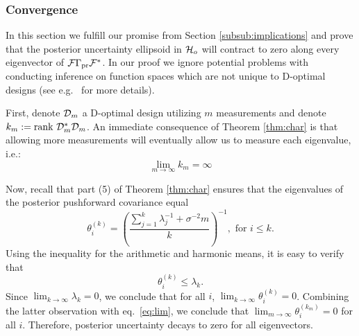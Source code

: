\subsubsection{Convergence}\label{subsub:convergence}
In this section we fulfill our promise from Section
\ref{subsub:implications} and prove that the posterior uncertainty
ellipsoid in $\mathcal{H}_o$ will contract to zero along every eigenvector of
$\mathcal{F} \Gamma_{\textup{pr}} \mathcal{F}^*$. In our proof we ignore potential problems with
conducting inference on function spaces which are not unique to
D-optimal designs (see e.g.~\cite{owhadi2015} for more details).


First, denote $\mathcal{D}_m$ a D-optimal design utilizing $m$ measurements
and denote $k_m := \textup{rank}\ \mathcal{D}_m^*\mathcal{D}_m$. An immediate consequence of
Theorem \ref{thm:char} is that allowing more measurements will
eventually allow us to measure each eigenvalue, i.e.:
\begin{equation}\label{eq:lim}
  \lim_{m\to\infty} k_m = \infty
\end{equation}

Now, recall that part (5) of Theorem \ref{thm:char} ensures that the
eigenvalues of the posterior pushforward covariance equal
\begin{equation*}
  \theta^{(k)}_i = \left ( \frac{\sum_{j=1}^{k} \lambda_j^{-1} +
    \sigma^{-2}m}{k} \right )^{-1}, \text{ for $i\leq k$}.
\end{equation*}
Using the inequality for the arithmetic and harmonic means, it is easy
to verify that
\begin{equation*}
  \theta^{(k)}_i \leq \lambda_{k}.
\end{equation*}
Since $\lim_{k\to \infty} \lambda_k= 0$, we conclude that for all $i$,
$\lim_{k\to\infty} \theta^{(k)}_i = 0$. Combining the latter
observation with eq.~\eqref{eq:lim}, we conclude that
$\lim_{m\to\infty} \theta^{(k_m)}_i = 0$ for all $i$. Therefore,
posterior uncertainty decays to zero for all eigenvectors.
